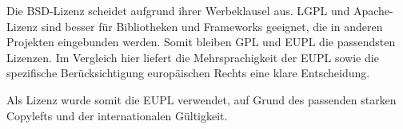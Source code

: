 Die \ac{BSD}-Lizenz scheidet aufgrund ihrer Werbeklausel aus. \ac{LGPL} und Apache-Lizenz sind besser für Bibliotheken und Frameworks geeignet, die in anderen Projekten eingebunden werden. Somit bleiben \ac{GPL} und \ac{EUPL} die passendsten Lizenzen. Im Vergleich hier liefert die Mehrsprachigkeit der \ac{EUPL} sowie die spezifische Berücksichtigung europäischen Rechts eine klare Entscheidung.

Als Lizenz wurde somit die \ac{EUPL} verwendet, auf Grund des passenden starken Copylefts und der internationalen Gültigkeit.